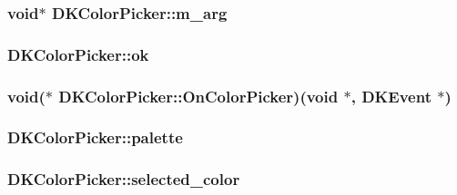 \hypertarget{class_d_k_color_picker_a560f58119ce901c3b4adc7c25b6680ae}{
\subsubsection[{m\-\_\-arg}]{\setlength{\rightskip}{0pt plus 5cm}void$\ast$ D\-K\-Color\-Picker\-::m\-\_\-arg}}\label{class_d_k_color_picker_a560f58119ce901c3b4adc7c25b6680ae}
\hypertarget{class_d_k_color_picker_ac5b7a15c4d4cb455a1411967265e62b0}{
\subsubsection[{ok}]{ D\-K\-Color\-Picker\-::ok}}\label{class_d_k_color_picker_ac5b7a15c4d4cb455a1411967265e62b0}
\hypertarget{class_d_k_color_picker_aedb0961fdfaed5d6f21bb31a51df3f7b}{
\subsubsection[{On\-Color\-Picker}]{\setlength{\rightskip}{0pt plus 5cm}void($\ast$ D\-K\-Color\-Picker\-::\-On\-Color\-Picker)(void $\ast$, {\bf D\-K\-Event} $\ast$)}}\label{class_d_k_color_picker_aedb0961fdfaed5d6f21bb31a51df3f7b}
\hypertarget{class_d_k_color_picker_a00ef57610642745db44a477ada9da610}{
\subsubsection[{palette}]{ D\-K\-Color\-Picker\-::palette}}\label{class_d_k_color_picker_a00ef57610642745db44a477ada9da610}
\hypertarget{class_d_k_color_picker_ab243ee53e2392d8496e0ff53910aa1af}{
\subsubsection[{selected\-\_\-color}]{ D\-K\-Color\-Picker\-::selected\-\_\-color}}\label{class_d_k_color_picker_ab243ee53e2392d8496e0ff53910aa1af}


